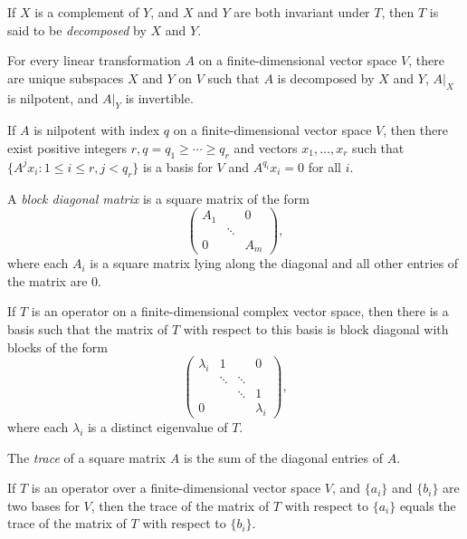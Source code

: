 \begin{defn}
  If $X$ is a complement of $Y$, and $X$ and $Y$ are both invariant under $T$,
  then $T$ is said to be \emph{decomposed} by $X$ and $Y$.
\end{defn}
\begin{prop}
  For every linear transformation $A$ on a finite-dimensional vector space $V$,
  there are unique subspaces $X$ and $Y$ on $V$ such that $A$ is decomposed by
  $X$ and $Y$, $A|_X$ is nilpotent, and $A|_Y$ is invertible.
\end{prop}
\begin{prop}
  If $A$ is nilpotent with index $q$ on a finite-dimensional vector space $V$,
  then there exist positive integers $r,q=q_1\ge\cdots\ge q_r$ and vectors
  $x_1,\ldots,x_r$ such that $\{A^j x_i:1\le i\le r,j<q_r\}$ is a basis for $V$
  and $A^{q_i}x_i=0$ for all $i$.
\end{prop}
\begin{defn}
  A \emph{block diagonal matrix} is a square matrix of the form
  \[\begin{pmatrix} A_1&&0 \\ &\ddots& \\0&&A_m \end{pmatrix},\]
  where each $A_i$ is a square matrix lying along the diagonal and all other
  entries of the matrix are $0$.
\end{defn}
\begin{thm}
  If $T$ is an operator on a finite-dimensional complex vector space, then there is a
  basis such that the matrix of $T$ with respect to this basis is block diagonal
  with blocks of the form
  \[\begin{pmatrix} \lambda_i&1&&0 \\
  &\ddots&\ddots& \\
  &&\ddots&1 \\
  0&&&\lambda_i\end{pmatrix},\]
  where each $\lambda_i$ is a distinct eigenvalue of $T$.
\end{thm}
\begin{defn}
  The \emph{trace} of a square matrix $A$ is the sum of the diagonal entries of
  $A$.
\end{defn}
\begin{prop}
  If $T$ is an operator over a finite-dimensional vector space $V$, and
  $\{a_i\}$ and $\{b_i\}$ are two bases for $V$, then the trace of the matrix of
  $T$ with respect to $\{a_i\}$ equals the trace of the matrix of $T$ with
  respect to $\{b_i\}$.
\end{prop}
